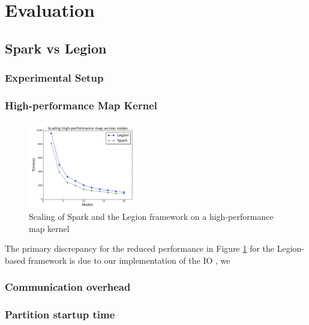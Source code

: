 \documentclass[tog]{acmsiggraph}
\begin{document}
\section{Evaluation}

\subsection{Spark vs Legion}

\subsubsection{Experimental Setup}

\subsubsection{High-performance Map Kernel}


\begin{figure}
\includegraphics[width=0.45\textwidth]{figures/scaling}
\caption{Scaling of Spark and the Legion framework on a high-performance map
  kernel }
\label{fig:scaling}
\end{figure}

The primary discrepancy for the reduced performance in Figure \ref{fig:scaling}
for the Legion-based framework is due to our implementation of the IO , we 

\subsubsection{Communication overhead}


\subsubsection{Partition startup time}
\end{document}
